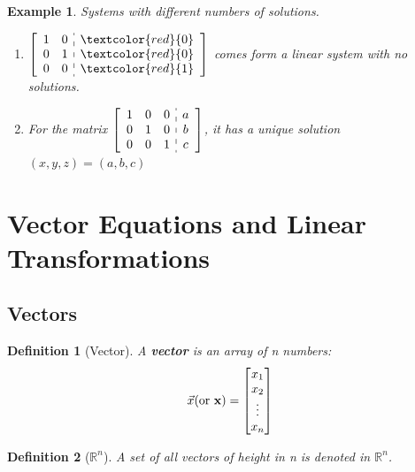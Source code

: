\documentclass[12pt, a4paper]{article}
\newtheorem{df}{Definition}[subsection]
\newtheorem{eg}{Example}[subsection]
\def\R{{\mathbb{R}}}
\begin{document}
\begin{eg} 
Systems with different numbers of solutions. 
\begin{enumerate}
\item  $\left[\begin{array}{c:c}\begin{matrix}1&0\\0&1\\0&0\end{matrix} &\begin{matrix}\textcolor{red}{0}\\\textcolor{red}{0}\\\textcolor{red}{1}\end{matrix}\end{array}\right]$ comes form a linear system with no solutions.
\item For the matrix $\left[\begin{array}{c:c}\begin{matrix}1&0&0\\0&1&0\\0&0&1\end{matrix}&\begin{matrix}a\\b\\c\end{matrix}\end{array}\right]$, it has a unique solution $(x,y,z)=(a,b,c)$
\end{enumerate}
\end{eg}


\newpage
\section{Vector Equations and Linear Transformations}
\subsection{Vectors}

\begin{df}[Vector]
A \textbf{vector} is an array of n numbers: $$\vec{x} (\text{or }\bold{x})=\begin{bmatrix}x_1\\x_2\\\vdots\\x_n\end{bmatrix}$$
\end{df}

\begin{df}[$\R^n$]
A set of all vectors of height in n is denoted in $\R^n$.
\end{df}
\end{document}

